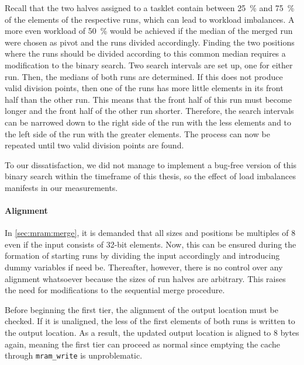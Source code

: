Recall that the two halves assigned to a tasklet contain between \qty{25}{\percent} and \qty{75}{\percent} of the elements of the respective runs, which can lead to workload imbalances.
A more even workload of \qty{50}{\percent} would be achieved if the median of the merged run were chosen as pivot and the runs divided accordingly.
Finding the two positions where the runs should be divided according to this common median requires a modification to the binary search.
Two search intervals are set up, one for either run.
Then, the medians of both runs are determined.
If this does not produce valid division points, then one of the runs has more little elements in its front half than the other run.
This means that the front half of this run must become longer and the front half of the other run shorter.
Therefore, the search intervals can be narrowed down to the right side of the run with the less elements and to the left side of the run with the greater elements.
The process can now be repeated until two valid division points are found.

To our dissatisfaction, we did not manage to implement a bug-free version of this binary search within the timeframe of this thesis, so the effect of load imbalances manifests in our measurements.


\paragraph{Alignment}
In \cref{sec:mram:merge}, it is demanded that all sizes and positions be multiples of 8 even if the input consists of 32-bit elements.
Now, this can be ensured during the formation of starting runs by dividing the input accordingly and introducing dummy variables if need be.
Thereafter, however, there is no control over any alignment whatsoever because the sizes of run halves are arbitrary.
This raises the need for modifications to the sequential merge procedure.

Before beginning the first tier, the alignment of the output location must be checked.
If it is unaligned, the less of the first elements of both runs is written to the output location.
As a result, the updated output location is aligned to 8 bytes again, meaning the first tier can proceed as normal since emptying the cache through \lstinline|mram_write| is unproblematic.

